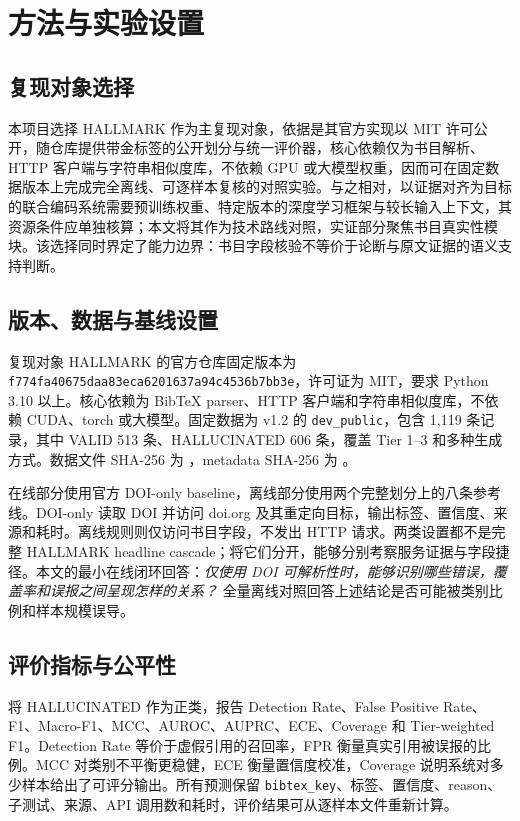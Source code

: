 \documentclass[UTF8,a4paper,11pt]{ctexart}
\begin{document}
\section{方法与实验设置}

\subsection{复现对象选择}

本项目选择 HALLMARK 作为主复现对象，依据是其官方实现以 MIT 许可公开，随仓库提供带金标签的公开划分与统一评价器，核心依赖仅为书目解析、HTTP 客户端与字符串相似度库，不依赖 GPU 或大模型权重，因而可在固定数据版本上完成完全离线、可逐样本复核的对照实验。与之相对，以证据对齐为目标的联合编码系统需要预训练权重、特定版本的深度学习框架与较长输入上下文，其资源条件应单独核算；本文将其作为技术路线对照，实证部分聚焦书目真实性模块。该选择同时界定了能力边界：书目字段核验不等价于论断与原文证据的语义支持判断。

\subsection{版本、数据与基线设置}

复现对象 HALLMARK 的官方仓库固定版本为
\texttt{f774fa40\allowbreak{}675daa83\allowbreak{}eca62016\allowbreak{}37a94c45\allowbreak{}36b7bb3e}，许可证为 MIT，要求 Python 3.10 以上。核心依赖为 BibTeX parser、HTTP 客户端和字符串相似度库，不依赖 CUDA、torch 或大模型。固定数据为 v1.2 的 \texttt{dev\_public}，包含 1,119 条记录，其中 VALID 513 条、HALLUCINATED 606 条，覆盖 Tier 1--3 和多种生成方式。数据文件 SHA-256 为 ，metadata SHA-256 为 。

在线部分使用官方 DOI-only baseline，离线部分使用两个完整划分上的八条参考线。DOI-only 读取 DOI 并访问 doi.org 及其重定向目标，输出标签、置信度、来源和耗时。离线规则则仅访问书目字段，不发出 HTTP 请求。两类设置都不是完整 HALLMARK headline cascade；将它们分开，能够分别考察服务证据与字段捷径。本文的最小在线闭环回答：\textit{仅使用 DOI 可解析性时，能够识别哪些错误，覆盖率和误报之间呈现怎样的关系？} 全量离线对照回答上述结论是否可能被类别比例和样本规模误导。

\subsection{评价指标与公平性}

将 HALLUCINATED 作为正类，报告 Detection Rate、False Positive Rate、F1、Macro-F1、MCC、AUROC、AUPRC、ECE、Coverage 和 Tier-weighted F1。Detection Rate 等价于虚假引用的召回率，FPR 衡量真实引用被误报的比例。MCC 对类别不平衡更稳健，ECE 衡量置信度校准，Coverage 说明系统对多少样本给出了可评分输出。所有预测保留 \texttt{bibtex\_key}、标签、置信度、reason、子测试、来源、API 调用数和耗时，评价结果可从逐样本文件重新计算。
\end{document}
